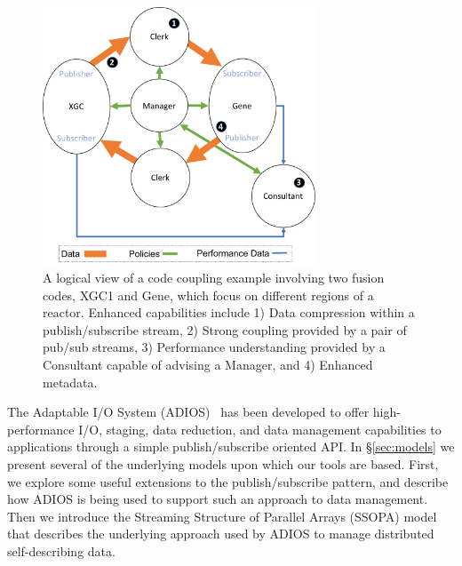\begin{figure}
\vspace{-10pt}
\includegraphics[width=3.2in]{figs/capabilities.pdf}
\caption{A logical view of a code coupling example involving two fusion codes, XGC1 and Gene, which focus on different regions of a reactor. Enhanced capabilities include 1) Data compression within a publish/subscribe stream, 2) Strong coupling provided by a pair of pub/sub streams, 3) Performance understanding provided by a Consultant capable of advising a Manager, and 4) Enhanced metadata.}
\label{fig:capabilities}
\vspace{-.1in}
\end{figure}

The Adaptable I/O System (ADIOS)~\cite{HelloAdios} has been developed to offer high-performance I/O, staging, data reduction, and data management capabilities to applications through a simple publish/subscribe oriented API. 
In \S\ref{sec:models} we present several of the underlying models upon which our tools are based. First, we explore some useful extensions to the publish/subscribe pattern, and describe how ADIOS is being used to support such an approach to data management. Then we introduce the Streaming Structure of Parallel Arrays (SSOPA) model that describes the underlying approach used by ADIOS to manage distributed self-describing data.





